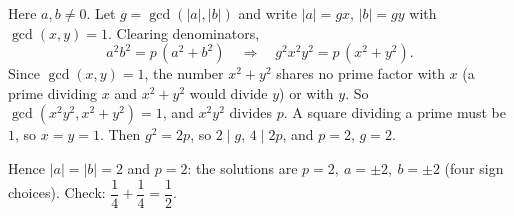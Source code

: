 Here $a,b\ne0$. Let $g=\gcd(|a|,|b|)$ and write $|a|=gx$, $|b|=gy$ with $\gcd(x,y)=1$. Clearing denominators,
\[
a^2b^2=p\,(a^2+b^2)\quad\Longrightarrow\quad g^2x^2y^2=p\,(x^2+y^2).
\]
Since $\gcd(x,y)=1$, the number $x^2+y^2$ shares no prime factor with $x$ (a prime dividing $x$ and $x^2+y^2$ would divide $y$) or with $y$. So $\gcd(x^2y^2,x^2+y^2)=1$, and $x^2y^2$ divides $p$. A square dividing a prime must be $1$, so $x=y=1$. Then $g^2=2p$, so $2\mid g$, $4\mid2p$, and $p=2$, $g=2$.

Hence $|a|=|b|=2$ and $p=2$: the solutions are $\boxed{p=2,\ a=\pm2,\ b=\pm2}$ (four sign choices). Check: $\dfrac{1}{4}+\dfrac{1}{4}=\dfrac{1}{2}$.
